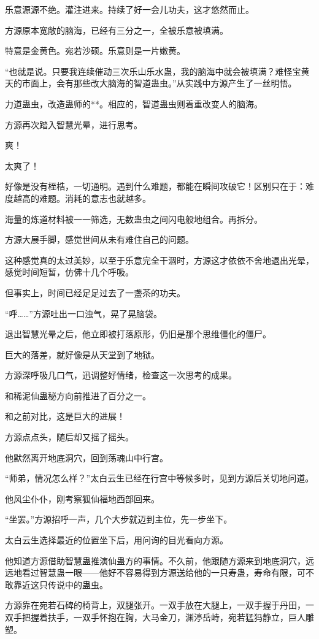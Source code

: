 \begin{this_body}
乐意源源不绝。灌注进来。持续了好一会儿功夫，这才悠然而止。

方源原本宽敞的脑海，已经有三分之一，全被乐意被填满。

特意是金黄色。宛若沙硕。乐意则是一片嫩黄。

“也就是说。只要我连续催动三次乐山乐水蛊，我的脑海中就会被填满？难怪宝黄天的市面上，会有那些改大脑海的智道蛊虫。”从实践中方源产生了一丝明悟。

力道蛊虫，改造蛊师的**。相应的，智道蛊虫则着重改变人的脑海。

方源再次踏入智慧光晕，进行思考。

爽！

太爽了！

好像是没有桎梏，一切通明。遇到什么难题，都能在瞬间攻破它！区别只在于：难度越高的难题。消耗的意志也就越多。

海量的炼道材料被一一筛选，无数蛊虫之间闪电般地组合。再拆分。

方源大展手脚，感觉世间从未有难住自己的问题。

这种感觉真的太过美妙，以至于乐意完全干涸时，方源这才依依不舍地退出光晕，感觉时间短暂，仿佛十几个呼吸。

但事实上，时间已经足足过去了一盏茶的功夫。

“呼……”方源吐出一口浊气，晃了晃脑袋。

退出智慧光晕之后，他立即被打落原形，仍旧是那个思维僵化的僵尸。

巨大的落差，就好像是从天堂到了地狱。

方源深呼吸几口气，迅调整好情绪，检查这一次思考的成果。

和稀泥仙蛊秘方向前推进了百分之一。

和之前对比，这是巨大的进展！

方源点点头，随后却又摇了摇头。

他默然离开地底洞穴，回到荡魂山中行宫。

“师弟，情况怎么样？”太白云生已经在行宫中等候多时，见到方源后关切地问道。

他风尘仆仆，刚考察狐仙福地西部回来。

“坐罢。”方源招呼一声，几个大步就迈到主位，先一步坐下。

太白云生选择最近的位置坐下后，用问询的目光看向方源。

他知道方源借助智慧蛊推演仙蛊方的事情。不久前，他跟随方源来到地底洞穴，远远地看过智慧蛊一眼——他好不容易得到方源送给他的一只寿蛊，寿命有限，可不敢靠近这只传说中的蛊虫。

方源靠在宛若石碑的椅背上，双腿张开。一双手放在大腿上，一双手握于丹田，一双手把握着扶手，一双手怀抱在胸，大马金刀，渊渟岳峙，宛若猛犸静立，巨人雕塑。


\end{this_body}
